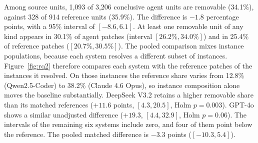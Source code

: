 \documentclass[a4paper,fleqn]{cas-sc}
\begin{document}
Among source units, 1,093 of 3,206 conclusive agent units are removable (34.1\%), against 328 of 914 reference units (35.9\%). The difference is $-1.8$ percentage points, with a 95\% interval of $[-8.6, 6.1]$. At least one removable unit of any kind appears in 30.1\% of agent patches (interval $[26.2\%, 34.0\%]$) and in 25.4\% of reference patches ($[20.7\%, 30.5\%]$). The pooled comparison mixes instance populations, because each system resolves a different subset of instances. Figure~\ref{fig:rq2} therefore compares each system with the reference patches of the instances it resolved. On those instances the reference share varies from 12.8\% (Qwen2.5-Coder) to 38.2\% (Claude 4.6 Opus), so instance composition alone moves the baseline substantially. DeepSeek V3.2 retains a higher removable share than its matched references ($+11.6$ points, $[4.3, 20.5]$, Holm $p=0.003$). GPT-4o shows a similar unadjusted difference ($+19.3$, $[4.4, 32.9]$, Holm $p=0.06$). The intervals of the remaining six systems include zero, and four of them point below the reference. The pooled matched difference is $-3.3$ points ($[-10.3, 5.4]$).
\end{document}
